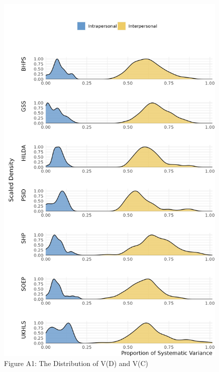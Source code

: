 \documentclass[
  12pt,
]{article}
\begin{document}
\newpage

\begin{figure}[htp]
\begin{center}
\caption*{Figure A1: The Distribution of V(D) and V(C)}

\includegraphics{../figures/figure_A1.png}

\end{center}
\end{figure}

\newpage
\end{document}
